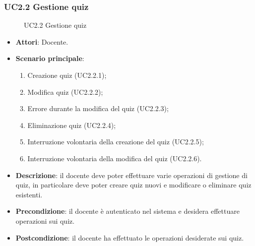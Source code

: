 \subsubsection{UC2.2 Gestione quiz}
\begin{figure}[H]
\centering
\noindent{}
\caption{UC2.2 Gestione quiz}
\end{figure}
\begin{itemize}
\item \textbf{Attori}: Docente.
\item \textbf{Scenario principale}:
\begin{enumerate}
\item Creazione quiz (UC2.2.1);
\item Modifica quiz (UC2.2.2);
\item Errore durante la modifica del quiz (UC2.2.3);
\item Eliminazione quiz (UC2.2.4);
\item Interruzione volontaria della creazione del quiz (UC2.2.5);
\item Interruzione volontaria della modifica del quiz (UC2.2.6).
\end{enumerate}
\item \textbf{Descrizione}: il docente deve poter effettuare varie operazioni di gestione di quiz, in particolare deve poter creare quiz nuovi e modificare o eliminare quiz esistenti.
\item \textbf{Precondizione}: il docente è autenticato nel sistema e desidera effettuare operazioni sui quiz.
\item \textbf{Postcondizione}: il docente ha effettuato le operazioni desiderate sui quiz.
\end{itemize}
